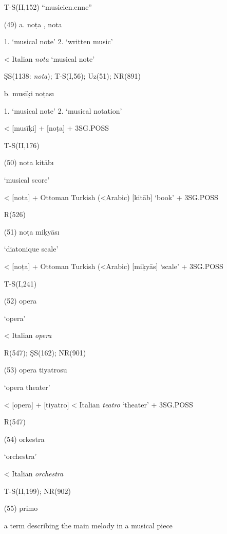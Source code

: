 \documentclass[output=paper,colorlinks,citecolor=brown,arabicfont,chinesefont]{langscibook}
\begin{document}
\begin{itemize}
    T-S(II,152) “musicien.enne”
    \item[(49)] a. noṭa {} , nota {} 

    1. ‘musical note’ 2. ‘written music’

    < Italian \emph{nota} ‘musical note’

    		ŞS(1138: \emph{nota}); T-S(I,56); Uz(51); NR(891)

      	b. musīḳi noṭası {} 

       1. ‘musical note’ 2. ‘musical notation’

       < {} [musīḳi] + {} [noṭa] + 3SG.POSS

       T-S(II,176)
    \item[(50)] nota kitābı {} 

    ‘musical score’

    < {} [nota] + Ottoman Turkish (<Arabic) {} [kitāb] ‘book’ + 3SG.POSS

    R(526)
    \item[(51)] noṭa miḳyāsı {}
    
    ‘diatonique scale’

    < {} [noṭa] + Ottoman Turkish (<Arabic) {} [miḳyās] ‘scale’ + 3SG.POSS

    T-S(I,241) 	
    \item[(52)] opera {} 

    ‘opera’

    < Italian \emph{opera}

    R(547); ŞS(162); NR(901)
    \item[(53)] opera tiyatrosu {}

    ‘opera theater’

    < {} [opera] + {} [tiyatro] < Italian \emph{teatro} ‘theater’ + 3SG.POSS

    R(547)
    \item[(54)] orkestra {} 

    ‘orchestra’

    < Italian \emph{orchestra}

    T-S(II,199); NR(902)
    \item[(55)] primo {}   

    a term describing the main melody in a musical piece


\end{itemize}
\end{document}
